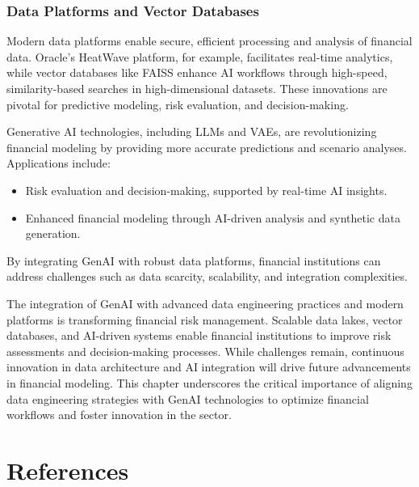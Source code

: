 \documentclass[a4paper,headinclude=on,footinclude=on,12pt,oneside]{scrbook}
\begin{document}
	\subsection{Data Platforms and Vector Databases}
	Modern data platforms enable secure, efficient processing and analysis of financial data. Oracle's HeatWave platform, for example, facilitates real-time analytics, while vector databases like FAISS enhance AI workflows through high-speed, similarity-based searches in high-dimensional datasets. These innovations are pivotal for predictive modeling, risk evaluation, and decision-making.
	
	Generative AI technologies, including LLMs and VAEs, are revolutionizing financial modeling by providing more accurate predictions and scenario analyses. Applications include:
	\begin{itemize}
		\item Risk evaluation and decision-making, supported by real-time AI insights.
		\item Enhanced financial modeling through AI-driven analysis and synthetic data generation.
	\end{itemize}
	By integrating GenAI with robust data platforms, financial institutions can address challenges such as data scarcity, scalability, and integration complexities.
	
	The integration of GenAI with advanced data engineering practices and modern platforms is transforming financial risk management. Scalable data lakes, vector databases, and AI-driven systems enable financial institutions to improve risk assessments and decision-making processes. While challenges remain, continuous innovation in data architecture and AI integration will drive future advancements in financial modeling. This chapter underscores the critical importance of aligning data engineering strategies with GenAI technologies to optimize financial workflows and foster innovation in the sector.
	
	
	
	\chapter*{References}
	
\end{document}
